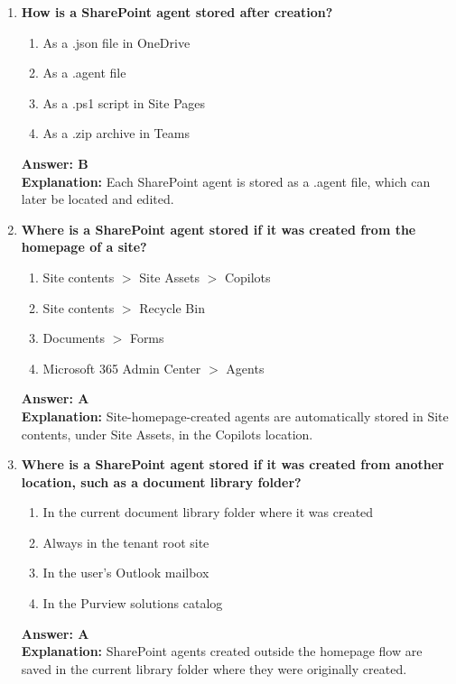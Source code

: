 \documentclass[10pt]{article}
\begin{document}
\begin{enumerate}[leftmargin=*]
\item \textbf{How is a SharePoint agent stored after creation?}
\begin{enumerate}[label=\Alph*.]
  \item As a .json file in OneDrive
  \item As a .agent file
  \item As a .ps1 script in Site Pages
  \item As a .zip archive in Teams
\end{enumerate}
\textbf{Answer: B}\\
\textbf{Explanation:} Each SharePoint agent is stored as a .agent file, which can later be located and edited.

\item \textbf{Where is a SharePoint agent stored if it was created from the homepage of a site?}
\begin{enumerate}[label=\Alph*.]
  \item Site contents $>$ Site Assets $>$ Copilots
  \item Site contents $>$ Recycle Bin
  \item Documents $>$ Forms
  \item Microsoft 365 Admin Center $>$ Agents
\end{enumerate}
\textbf{Answer: A}\\
\textbf{Explanation:} Site-homepage-created agents are automatically stored in Site contents, under Site Assets, in the Copilots location.

\item \textbf{Where is a SharePoint agent stored if it was created from another location, such as a document library folder?}
\begin{enumerate}[label=\Alph*.]
  \item In the current document library folder where it was created
  \item Always in the tenant root site
  \item In the user's Outlook mailbox
  \item In the Purview solutions catalog
\end{enumerate}
\textbf{Answer: A}\\
\textbf{Explanation:} SharePoint agents created outside the homepage flow are saved in the current library folder where they were originally created.


\end{enumerate}
\end{document}
